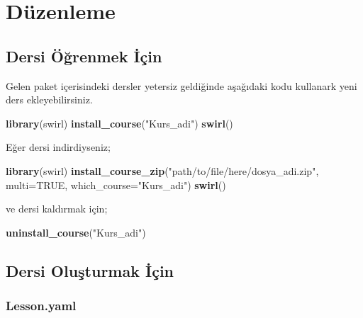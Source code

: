 \documentclass[]{book}
\newenvironment{Shaded}{\begin{snugshade}}{\end{snugshade}}
\newcommand{\KeywordTok}[1]{\textcolor[rgb]{0.13,0.29,0.53}{\textbf{#1}}}
\newcommand{\DataTypeTok}[1]{\textcolor[rgb]{0.13,0.29,0.53}{#1}}
\newcommand{\StringTok}[1]{\textcolor[rgb]{0.31,0.60,0.02}{#1}}
\newcommand{\OtherTok}[1]{\textcolor[rgb]{0.56,0.35,0.01}{#1}}
\newcommand{\NormalTok}[1]{#1}
\begin{document}
\section{Düzenleme}\label{duzenleme-2}

\subsection{Dersi Öğrenmek İçin}\label{dersi-ogrenmek-icin-1}

Gelen paket içerisindeki dersler yetersiz geldiğinde aşağıdaki kodu
kullanark yeni ders ekleyebilirsiniz.

\begin{Shaded}
\begin{Highlighting}[]
\KeywordTok{library}\NormalTok{(swirl)}
\KeywordTok{install_course}\NormalTok{(}\StringTok{"Kurs_adi"}\NormalTok{)}
\KeywordTok{swirl}\NormalTok{()}
\end{Highlighting}
\end{Shaded}

Eğer dersi indirdiyseniz;

\begin{Shaded}
\begin{Highlighting}[]
\KeywordTok{library}\NormalTok{(swirl)}
\KeywordTok{install_course_zip}\NormalTok{(}\StringTok{"path/to/file/here/dosya_adi.zip"}\NormalTok{, }\DataTypeTok{multi=}\OtherTok{TRUE}\NormalTok{, }
                   \DataTypeTok{which_course=}\StringTok{"Kurs_adi"}\NormalTok{)}
\KeywordTok{swirl}\NormalTok{()}
\end{Highlighting}
\end{Shaded}

ve dersi kaldırmak için;

\begin{Shaded}
\begin{Highlighting}[]
\KeywordTok{uninstall_course}\NormalTok{(}\StringTok{"Kurs_adi"}\NormalTok{)}
\end{Highlighting}
\end{Shaded}

\subsection{Dersi Oluşturmak İçin}\label{dersi-olusturmak-icin}

\subsubsection{Lesson.yaml}\label{lesson.yaml}
\end{document}
